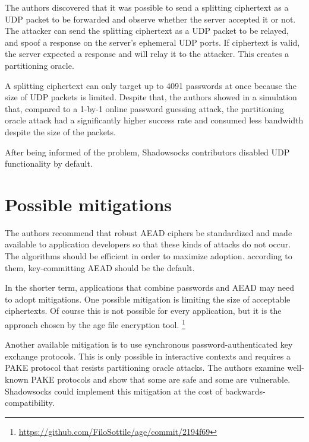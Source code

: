 \documentclass[9pt, a4paper]{article}
\begin{document}
The authors discovered that it was possible to send a splitting ciphertext as a
UDP packet to be forwarded and observe whether the server accepted it or not.
The attacker can send the splitting ciphertext as a UDP packet to be relayed,
and spoof a response on the server's ephemeral UDP ports.
If ciphertext is valid, the server expected a response and will relay it to the attacker.
This creates a partitioning oracle.

A splitting ciphertext can only target up to 4091 passwords at once because the size of UDP packets is limited.
Despite that,
the authors showed in a simulation that,
compared to a 1-by-1 online password guessing attack,
the partitioning oracle attack had a significantly higher success rate and consumed less bandwidth despite the size of the packets.

After being informed of the problem,
Shadowsocks contributors disabled UDP functionality by default.

\section{Possible mitigations}
The authors recommend that robust AEAD ciphers be standardized and made available to application developers so that these kinds of attacks do not occur. The algorithms should be efficient in order to maximize adoption. according to them, key-committing AEAD should be the default.

In the shorter term, applications that combine passwords and AEAD may need to adopt mitigations.
One possible mitigation is
limiting the size of acceptable ciphertexts.
Of course this is not possible for every application,
but it is the approach chosen by the age file encryption tool.
\footnote{\url{https://github.com/FiloSottile/age/commit/2194f69}}

Another available mitigation is
to use synchronous password-authenticated key exchange protocols.
This is only possible in interactive contexts
and requires a PAKE protocol that resists partitioning oracle attacks.
The authors examine well-known PAKE protocols and show that some are safe and some are vulnerable.
Shadowsocks could implement this mitigation at the cost of backwards-compatibility.


\footnotesize 
\end{document}
